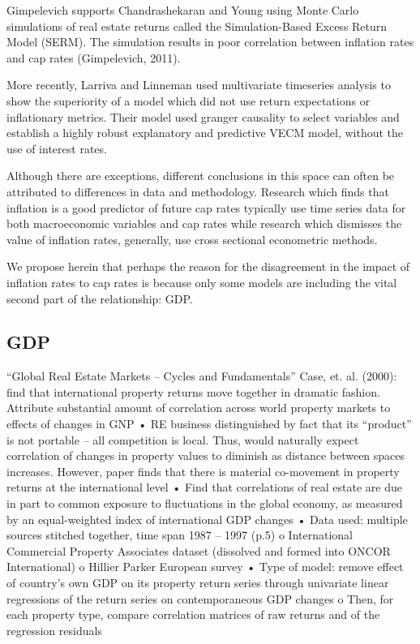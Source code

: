 Gimpelevich \citep*{Gimpelevich2011} supports Chandrashekaran and Young using Monte Carlo simulations of real estate returns called the Simulation-Based Excess Return Model (SERM). The simulation results in poor correlation between inflation rates and cap rates (Gimpelevich, 2011).

More recently, Larriva and Linneman \citep*{larriva2021determinants} used multivariate timeseries analysis to show the superiority of a model which did not use return expectations or inflationary metrics. Their model used granger causality to select variables and establish a highly robust explanatory and predictive VECM model, without the use of interest rates.

Although there are exceptions, different conclusions in this space can often be attributed to differences in data and methodology. Research which finds that inflation is a good predictor of future cap rates typically use time series data for both macroeconomic variables and cap rates while research which dismisses the value of inflation rates, generally, use cross sectional econometric methods.

We propose herein that perhaps the reason for the disagreement in the impact of inflation rates to cap rates is because only some models are including the vital second part of the relationship: GDP.


\subsection{GDP}


“Global Real Estate Markets – Cycles and Fundamentals”
Case, et. al. (2000): find that international property returns move together in dramatic fashion. Attribute substantial amount of correlation across world property markets to effects of changes in GNP
•	RE business distinguished by fact that its “product” is not portable – all competition is local. Thus, would naturally expect correlation of changes in property values to diminish as distance between spaces increases. However, paper finds that there is material co-movement in property returns at the international level
•	Find that correlations of real estate are due in part to common exposure to fluctuations in the global economy, as measured by an equal-weighted index of international GDP changes
•	Data used: multiple sources stitched together, time span 1987 – 1997 (p.5)
o	International Commercial Property Associates dataset (dissolved and formed into ONCOR International) 
o	Hillier Parker European survey
•	Type of model: remove effect of country’s own GDP on its property return series through univariate linear regressions of the return series on contemporaneous GDP changes
o	Then, for each property type, compare correlation matrices of raw returns and of the regression residuals

